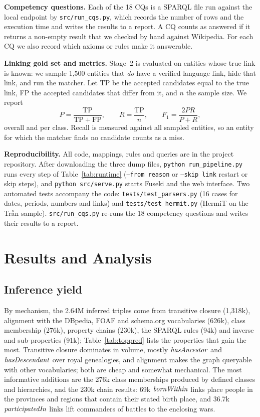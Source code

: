 \documentclass{article}
\newcommand{\cls}[1]{\ensuremath{\text{\textit{#1}}}}  %
\newcommand{\ttl}[1]{\texttt{#1}}          %
\begin{document}
\textbf{Competency questions.} Each of the 18 CQs is a SPARQL file run against the local endpoint by
\ttl{src/run\_cqs.py}, which records the number of rows and the execution time and writes the results to a report. A
CQ counts as answered if it returns a non-empty result that we checked by hand against Wikipedia. For each CQ we also
record which axioms or rules make it answerable.

\textbf{Linking gold set and metrics.} Stage~2 is evaluated on entities whose true link is known: we sample 1{,}500
entities that \emph{do} have a verified language link, hide that link, and run the matcher. Let TP be the accepted
candidates equal to the true link, FP the accepted candidates that differ from it, and $n$ the sample size. We report
\begin{equation}
  P = \frac{\mathrm{TP}}{\mathrm{TP} + \mathrm{FP}}, \qquad R = \frac{\mathrm{TP}}{n}, \qquad
  F_1 = \frac{2PR}{P + R},
\end{equation}
overall and per class. Recall is measured against all sampled entities, so an entity for which the matcher finds no
candidate counts as a miss.

\textbf{Reproducibility.} All code, mappings, rules and queries are in the project repository. After downloading the three dump files,
\ttl{python run\_pipeline.py} runs every step of Table~\ref{tab:runtime} (\ttl{--from reason} or \ttl{--skip link}
restart or skip steps), and \ttl{python src/serve.py} starts Fuseki and the web interface. Two automated tests accompany
the code: \ttl{tests/test\_parsers.py} (16 cases for dates, periods, numbers and links) and \ttl{tests/test\_hermit.py}
(HermiT on the Trần sample). \ttl{src/run\_cqs.py} re-runs the 18 competency questions and writes their results to a
report.

\section{Results and Analysis}\label{sec:results}

\subsection{Inference yield}

By mechanism, the 2.64M inferred triples come from transitive closure (1{,}318k), alignment with the DBpedia, FOAF
and schema.org vocabularies (626k), class membership (276k), property chains (230k), the SPARQL rules (94k) and
inverse and sub-properties (91k); Table~\ref{tab:toppred} lists the properties that gain the most. Transitive closure
dominates in volume, mostly \cls{hasAncestor} and \cls{hasDescendant} over royal genealogies, and alignment makes the
graph queryable with other vocabularies; both are cheap and somewhat mechanical. The most informative additions are the
276k class memberships produced by defined classes and hierarchies, and the 230k chain results: 69k \cls{bornWithin}
links place people in the provinces and regions that contain their stated birth place, and 36.7k
\cls{participatedIn} links lift commanders of battles to the enclosing wars.
\end{document}

